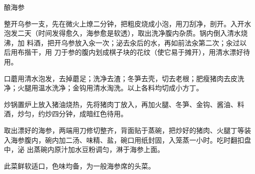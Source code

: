 %
%
%
%
%
%
%
\begin{recipe}[一品海参]{酿海参}

\ingredients


\preparation

\step 整开乌参一支，先在微火上燎二分钟，把粗皮烧成小泡，用刀刮净，剖开。入开水
泡发二天（时间发得愈久，海参愈是软透），取出洗净腹内杂质。锅内倒入清水烧沸，加
料酒，把开乌参放入汆一次；泌去汆后的水，再如前法汆第二次；汆过以后用布揩干，用
刀于参的腹内划成棋子块的花纹（使它易于摊开），用清水漂好待用。

\step 口蘑用清水泡发，去掉蘑足；洗净去渣；冬笋去壳，切去老根；肥瘦猪肉去皮洗
净；火腿用温水洗净；金钩用清水淘洗。以上各料均切成小方丁。

\step 炒锅置炉上放入猪油烧热，先将猪肉丁放入，再加火腿、冬笋、金钩、酱油、料
酒，炒匀，约炒四分钟，成暗红色待用。

\step 取出漂好的海参，两端用刀修切整齐，背面贴于蒸碗，把炒好的猪肉、火腿丁等装
入海参腹内，碗内加二汤、味精、盐，碗口用纸封固，入笼蒸一小时。吃时翻扣盘中，泌
出蒸碗内原汁加水豆粉调匀，淋于海参上面。

\features

此菜鲜软适口，色味均备，为一般海参席的头菜。

\end{recipe}

